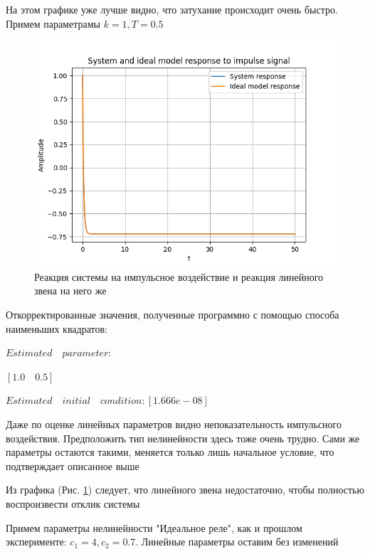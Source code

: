 На этом графике уже лучше видно, что затухание происходит очень быстро. Примем параметрамы $ k = 1, T = 0.5 $

\begin{figure}[H]
	\centering
	\includegraphics[width=0.8\linewidth]{body/images/System-and-ideal-model-response-to-impulse-signal.png}
	\caption{Реакция системы на импульсное воздействие и реакция линейного звена на него же}
	\label{fig:6}
\end{figure}

Откорректированные значения, полученные программно с помощью способа наименьших квадратов:

$Estimated\quad parameter:$

\qquad$[1.0\quad 0.5]$

$Estimated\quad initial\quad condition: [1.666e-08]$

Даже по оценке линейных параметров видно непоказательность импульсного воздействия. Предположить тип нелинейности здесь тоже очень трудно.
Сами же параметры остаются такими, меняется только лишь начальное условие, что подтверждает описанное выше

Из графика (Рис. \ref{fig:6}) следует, что линейного звена недостаточно, чтобы полностью воспроизвести отклик системы

Примем параметры нелинейности "Идеальное реле", как и прошлом эксперименте: $ c_1 = 4, c_2 = 0.7 $. Линейные параметры оставим без изменений


